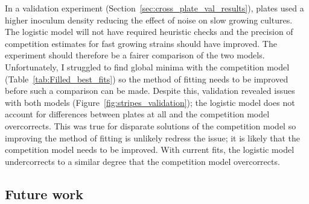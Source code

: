In a validation experiment
(Section~\ref{sec:cross_plate_val_results}), plates used a higher
inoculum density reducing the effect of noise on slow growing
cultures. The logistic model will not have required heuristic checks
and the precision of competition estimates for fast growing strains
should have improved. The experiment should therefore be a fairer
comparison of the two models. Unfortunately, I struggled to find
global minima with the competition model
(Table~\ref{tab:Filled_best_fits}) so the method of fitting needs to
be improved before such a comparison can be made. Despite this,
validation revealed issues with both models
(Figure~\ref{fig:stripes_validation}); the logistic model does not
account for differences between plates at all and the competition
model overcorrects. This was true for disparate solutions of the
competition model so improving the method of fitting is unlikely
redress the issue; it is likely that the competition model needs to be
improved. With current fits, the logistic model undercorrects to a
similar degree that the competition model overcorrects.



\subsection{Future work}




